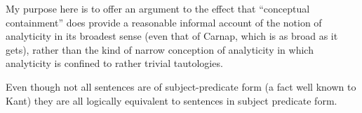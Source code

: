 \documentclass[10pt,titlepage]{article}
\begin{document}
My purpose here is to offer an argument to the effect that ``conceptual containment'' does
provide a reasonable informal account of the notion of analyticity in its broadest sense
(even that of Carnap, which is as broad as it gets), rather than the kind of narrow
conception of analyticity in which analyticity is confined to rather trivial tautologies.

Even though not all sentences are of subject-predicate form (a fact well known to Kant)
they are all logically equivalent to sentences in subject predicate form.






%
%






\end{document}
